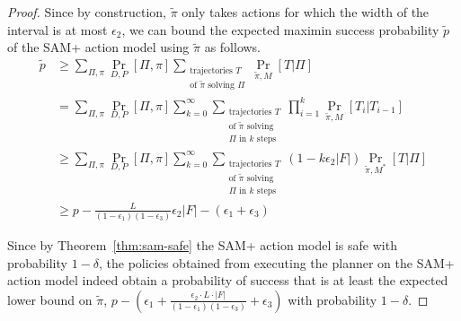 \documentclass[letterpaper]{article} %
\begin{document}
\begin{proof}
Since by construction, $\tilde{\pi}$ only takes actions for which the width of the interval is at most $\epsilon_2$, we can bound the expected maximin success probability $\tilde{p}$ of the SAM+ action model using $\tilde{\pi}$ as follows.
\begin{align*}
\tilde{p} &\geq \sum_{\Pi,\pi}\Pr_{D,P}[\Pi,\pi]\sum_{\substack{\text{trajectories }T\\\text{of }\tilde{\pi}\text{ solving }\Pi}}\Pr_{\tilde{\pi},M}[T|\Pi]\\
&=\sum_{\Pi,\pi}\Pr_{D,P}[\Pi,\pi]\sum_{k=0}^\infty\sum_{\substack{\text{trajectories }T\\\text{of }\tilde{\pi}\text{ solving}\\
\Pi\text{ in }k\text{ steps}}}\prod_{i=1}^k\Pr_{\tilde{\pi},M}[T_i|T_{i-1}]\\
&\geq \sum_{\Pi,\pi}\Pr_{D,P}[\Pi,\pi]\sum_{k=0}^\infty\sum_{\substack{\text{trajectories }T\\\text{of }\tilde{\pi}\text{ solving}\\
\Pi\text{ in }k\text{ steps}}}(1-k\epsilon_2|F|)\Pr_{\tilde{\pi},M^*}[T|\Pi]\\
&\geq p-\frac{L}{(1-\epsilon_1)(1-\epsilon_3)}\epsilon_2|F|-(\epsilon_1+\epsilon_3)
\end{align*}

Since by Theorem~\ref{thm:sam-safe} the SAM+ action model is safe with probability $1-\delta$, the policies obtained from executing the planner on the SAM+ action model indeed obtain a probability of success that is at least the expected lower bound on $\tilde{\pi}$, $p-(\epsilon_1+\frac{\epsilon_2\cdot L\cdot |F|}{(1-\epsilon_1)(1-\epsilon_3)}+\epsilon_3)$ with probability $1-\delta$.
\end{proof}
\end{document}
